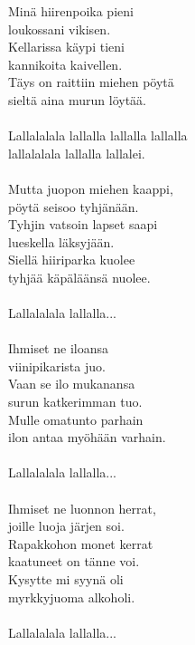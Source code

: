 
            Minä hiirenpoika pieni  \\
            loukossani vikisen.  \\
            Kellarissa käypi tieni  \\
            kannikoita kaivellen.  \\
            Täys on raittiin miehen pöytä  \\
            sieltä aina murun löytää. \\
\hspace{10mm} \\
            Lallalalala lallalla lallalla lallalla \\
            lallalalala lallalla lallalei. \\
\hspace{10mm} \\
            Mutta juopon miehen kaappi,  \\
            pöytä seisoo tyhjänään.  \\
            Tyhjin vatsoin lapset saapi  \\
            lueskella läksyjään.  \\
            Siellä hiiriparka kuolee  \\
            tyhjää käpäläänsä nuolee. \\
\hspace{10mm} \\
            Lallalalala lallalla... \\
\hspace{10mm} \\
            Ihmiset ne iloansa  \\
            viinipikarista juo.  \\
            Vaan se ilo mukanansa  \\
            surun katkerimman tuo.  \\
            Mulle omatunto parhain  \\
            ilon antaa myöhään varhain. \\
\hspace{10mm} \\
            Lallalalala lallalla... \\
\hspace{10mm} \\
            Ihmiset ne luonnon herrat,  \\
            joille luoja järjen soi. \\
            Rapakkohon monet kerrat \\
            kaatuneet on tänne voi. \\
            Kysytte mi syynä oli \\
            myrkkyjuoma alkoholi. \\
\hspace{10mm} \\
            Lallalalala lallalla... \\
